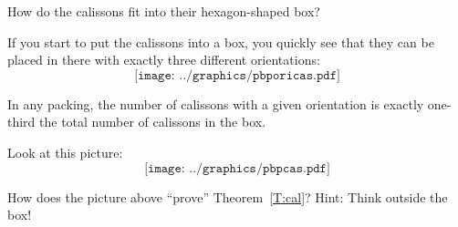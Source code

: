 \begin{question} How do the calissons fit into their hexagon-shaped box?
\end{question}

If you start to put the calissons into a box, you quickly see that they can be placed in there with exactly three different orientations:
\[
\texttt{[image: ../graphics/pbporicas.pdf]}
\]
\begin{theorem}\label{T:cal} In any packing, the number of calissons with a given orientation is exactly one-third the total number of calissons in the box.
\end{theorem}

Look at this picture:
\[
\texttt{[image: ../graphics/pbpcas.pdf]}
\]

\begin{question} How does the picture above ``prove'' Theorem~\ref{T:cal}? Hint: Think outside the box!
\end{question}
\QM




